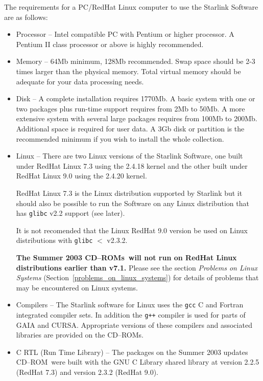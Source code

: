 \documentclass[twoside,11pt]{article}
\newcommand{\htmlref}[2]{#1}
\newcommand{\latex}[1]{#1}
\renewcommand{\_}{\texttt{\symbol{95}}}
\newcommand{\cdrom}{CD--ROM}
\newcommand{\cdrom}{CD-ROM}
\newcommand{\cdroms}{CD--ROMs}
\newcommand{\cdroms}{CD-ROMs}
\newcommand{\rhafull}{1770Mb}
\begin{document}
The requirements for a PC/RedHat Linux computer to use the Starlink Software
are as follows:

\begin{itemize}

\item Processor -- Intel compatible PC with Pentium or higher
processor.  A Pentium II class processor or above is highly recommended.

\item Memory -- 64Mb minimum, 128Mb recommended.  Swap space should be
2-3 times larger than the physical memory. Total virtual memory should be 
adequate for your data processing needs.

\item Disk -- A complete installation requires \rhafull.
A basic system with one or two packages plus run-time support requires
from 2Mb to 50Mb.  A more extensive system with several large packages
requires from 100Mb to 200Mb.   Additional space is required for user
data.  A 3Gb disk or partition is the recommended minimum if you wish
to install the whole collection.

\item Linux -- There are two Linux versions of the Starlink Software, 
one built under RedHat Linux 7.3 using the 2.4.18 kernel and the other 
built under RedHat Linux 9.0 using the 2.4.20 kernel.

RedHat Linux 7.3 is the Linux distribution supported by Starlink but it
should also be possible to run the Software on any Linux distribution
that has \texttt{glibc} v2.2 support (see later).

It is not recomended that the Linux RedHat 9.0 version be used
on Linux distributions with  \texttt{glibc} $<$ v2.3.2.

\textbf{The Summer 2003 \cdroms\ will not run on RedHat Linux
distributions earlier than v7.1.} Please see the section
\htmlref{\textit{Problems on Linux Systems}}{problems_on_linux_systems}
\latex{(Section~\ref{problems_on_linux_systems})} for details of problems
that may be encountered on Linux systems.

\item Compilers -- The Starlink software for Linux uses the
\texttt{gcc} C and Fortran integrated compiler sets.  In addition the
\texttt{g++} compiler is used for parts of GAIA and CURSA.  Appropriate
versions of these compilers and associated libraries are provided on
the \cdroms.

\item C RTL (Run Time Library) -- The packages on the Summer 2003
updates \cdrom\ were built with the GNU C Library shared library at
version 2.2.5 (RedHat 7.3) and version 2.3.2 (RedHat 9.0).

\end{itemize}
\end{document}
